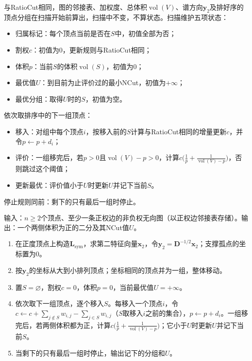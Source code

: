 与RatioCut相同，图的邻接表、加权度、总体积$\operatorname{vol}(V)$、谱方向$\bm y_2$及排好序的顶点分组在扫描开始前算出，扫描中不变，不算状态。扫描维护五项状态：
\begin{itemize}
  \item 归属标记：每个顶点当前是否在$S$中，初值全部为否；
  \item 割权$c$：初值为$0$，更新规则与RatioCut相同；
  \item 体积$p$：当前$S$的体积$\operatorname{vol}(S)$，初值为$0$；
  \item 最优值$U$：到目前为止评价过的最小NCut，初值为$+\infty$；
  \item 最优分组：取得$U$时的$S$，初值为空。
\end{itemize}
依次取排序中的下一组顶点：
\begin{itemize}
  \item 移入：对组中每个顶点$i$，按移入前的$S$计算与RatioCut相同的增量更新$c$，并令$p\gets p+d_i$；
  \item 评价：一组移完后，若$p>0$且$\operatorname{vol}(V)-p>0$，计算$c\bigl(\tfrac1p+\tfrac1{\operatorname{vol}(V)-p}\bigr)$，否则跳过这个阈值；
  \item 更新最优：评价值小于$U$时更新$U$并记下当前$S$。
\end{itemize}
停止规则同前：剩下的只有最后一组时停止。

\begin{algorithm}
\label{alg:graph-spec-ncut-sweep}
输入：$n\geq2$个顶点、至少一条正权边的非负权无向图（以正权边邻接表存储）。输出：一个两侧体积为正的二分及其NCut值$U$。
\begin{enumerate}
 \item 在正度顶点上构造$\bm L_{\mathrm{sym}}$，求第二特征向量$\bm x_2$，令$\bm y_2=\bm D^{-1/2}\bm x_2$；支撑孤点的坐标置为$0$。
 \item 按$\bm y_2$的坐标从大到小排列顶点；坐标相同的顶点并为一组，整体移动。
 \item 置$S=\varnothing$，割权$c=0$，体积$p=0$，当前最优值$U=+\infty$。
 \item 依次取下一组顶点，逐个移入$S$。每移入一个顶点$i$，令$c\gets c+\sum_{j\notin S}w_{i,j}-\sum_{j\in S}w_{i,j}$（$S$取移入$i$之前的集合），$p\gets p+d_i$。一组移完后，若两侧体积都为正，计算$c\bigl(\tfrac1p+\tfrac1{\operatorname{vol}(V)-p}\bigr)$；它小于$U$时更新$U$并记下当前$S$。
 \item 当剩下的只有最后一组时停止，输出记下的分组和$U$。
\end{enumerate}
\end{algorithm}

